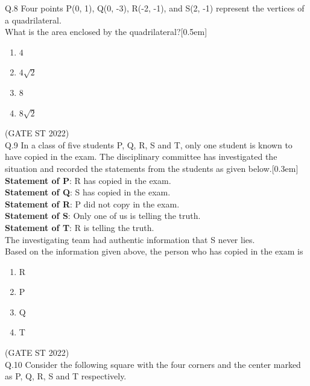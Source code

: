 \documentclass[journal,12pt,onecolumn]{IEEEtran}
\theoremstyle{remark}
\begin{document}
	 	\vspace{2em}
Q.8 Four points P(0, 1), Q(0, -3), R(-2, -1), and S(2, -1) represent the vertices of a quadrilateral.\\
	 What is the area enclosed by the quadrilateral?[0.5em]
	 \begin{multicols}{4}
	 \begin{enumerate}[label=(\Alph*)]
	 	\item $ 4 $
	 	\item $ 4\sqrt{2} $
	 	\item $ 8 $
	 	\item $ 8\sqrt{2} $
	 
	 \end{enumerate}
	\end{multicols}
		\hfill (GATE ST 2022)\\
	 	\vspace{2em}
Q.9 In a class of five students P, Q, R, S and T, only one student is known to have copied in the exam. The disciplinary committee has investigated the situation and recorded the statements from the students as given below.[0.3em]
	 \textbf{Statement of P}: R has copied in the exam. \\
	 \textbf{Statement of Q}: S has copied in the exam. \\
	 \textbf{Statement of R}: P did not copy in the exam. \\
	 \textbf{Statement of S}: Only one of us is telling the truth. \\
	 \textbf{Statement of T}: R is telling the truth. \\
	 The investigating team had authentic information that S never lies.\\
	 Based on the information given above, the person who has copied in the exam is
	 \begin{multicols}{4}
	 \begin{enumerate}[label=(\Alph*)]
	 	\item R
	 	\item P
	 	\item Q
	 	\item T
	 	
	 \end{enumerate}
	\end{multicols}
	\hfill (GATE ST 2022)\\
	 	\vspace{2em}
Q.10 Consider the following square with the four corners and the center marked as P, Q, R, S and T respectively.\\
\end{document}
